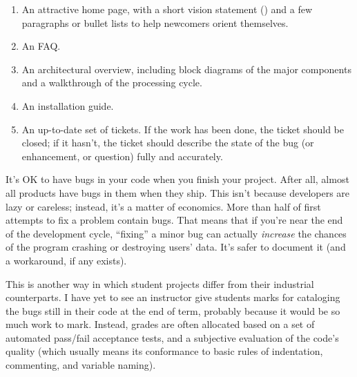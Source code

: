 \documentclass{report}
\begin{document}
\begin{enumerate}

  \item An attractive home page, with a short vision statement
  () and a few paragraphs or bullet lists to
  help newcomers orient themselves.

  \item An FAQ.

  \item An architectural overview, including block diagrams of the
  major components and a walkthrough of the processing cycle.

  \item An installation guide.

  \item An up-to-date set of tickets.  If the work has been done, the
  ticket should be closed; if it hasn't, the ticket should describe
  the state of the bug (or enhancement, or question) fully and
  accurately.

\end{enumerate}


It's OK to have bugs in your code when you finish your project.  After
all, almost all products have bugs in them when they ship.  This isn't
because developers are lazy or careless; instead, it's a matter of
economics.  More than half of first attempts to fix a problem contain
bugs.  That means that if you're
near the end of the development cycle, ``fixing'' a minor bug can
actually \emph{increase} the chances of the program crashing or
destroying users' data.  It's safer to document it (and a workaround,
if any exists).

This is another way in which student projects differ from their
industrial counterparts.  I have yet to see an instructor give
students marks for cataloging the bugs still in their code at the end
of term, probably because it would be so much work to mark.  Instead,
grades are often allocated based on a set of automated pass/fail
acceptance tests, and a subjective evaluation of the code's quality
(which usually means its conformance to basic rules of indentation,
commenting, and variable naming).

\end{document}
